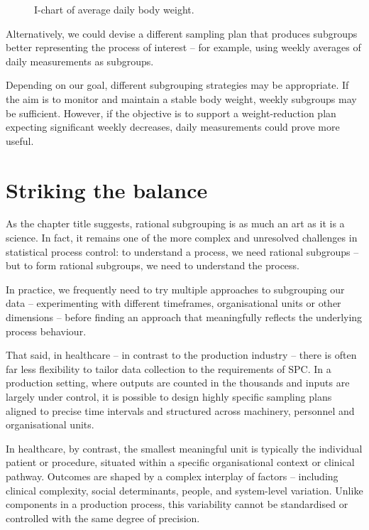 \documentclass[
]{book}
\makeatletter
\newcommand*\pandocbounded[1]{%
  \sbox\pandoc@box{#1}%
  \Gscale@div\@tempa{\textheight}{\dimexpr\ht\pandoc@box+\dp\pandoc@box\relax}%
  \Gscale@div\@tempb{\linewidth}{\wd\pandoc@box}%
  \ifdim\@tempb\p@<\@tempa\p@\let\@tempa\@tempb\fi%
  \ifdim\@tempa\p@<\p@\scalebox{\@tempa}{\usebox\pandoc@box}%
  \else\usebox{\pandoc@box}%
  \fi%
}
\makeatother
\begin{document}
\begin{figure}
\centering
\pandocbounded{}
\caption{\label{fig:subgroups-fig4}I-chart of average daily body weight.}
\end{figure}

Alternatively, we could devise a different sampling plan that produces subgroups better representing the process of interest -- for example, using weekly averages of daily measurements as subgroups.

Depending on our goal, different subgrouping strategies may be appropriate. If the aim is to monitor and maintain a stable body weight, weekly subgroups may be sufficient. However, if the objective is to support a weight-reduction plan expecting significant weekly decreases, daily measurements could prove more useful.

\section{Striking the balance}\label{striking-the-balance}

As the chapter title suggests, rational subgrouping is as much an art as it is a science. In fact, it remains one of the more complex and unresolved challenges in statistical process control: to understand a process, we need rational subgroups -- but to form rational subgroups, we need to understand the process.

In practice, we frequently need to try multiple approaches to subgrouping our data -- experimenting with different timeframes, organisational units or other dimensions -- before finding an approach that meaningfully reflects the underlying process behaviour.

That said, in healthcare -- in contrast to the production industry -- there is often far less flexibility to tailor data collection to the requirements of SPC. In a production setting, where outputs are counted in the thousands and inputs are largely under control, it is possible to design highly specific sampling plans aligned to precise time intervals and structured across machinery, personnel and organisational units.

In healthcare, by contrast, the smallest meaningful unit is typically the individual patient or procedure, situated within a specific organisational context or clinical pathway. Outcomes are shaped by a complex interplay of factors -- including clinical complexity, social determinants, people, and system-level variation. Unlike components in a production process, this variability cannot be standardised or controlled with the same degree of precision.
\end{document}
